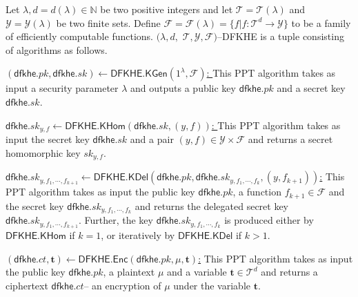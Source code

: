 \documentclass[runningheads,10pt]{llncs}
\begin{document}
\begin{definition}[DFKHE] \label{dfkhe2} Let $\lambda, d=d(\lambda) \in \mathbb{N}$ 
be two positive integers and  let  $\mathcal{T}=\mathcal{T}(\lambda)$ and $\mathcal{Y}=\mathcal{Y} (\lambda)$ be two finite sets. 
Define $\mathcal{F}=\mathcal{F}(\lambda)=\{f| f: \mathcal{T}^{d}  \rightarrow \mathcal{Y} \}$ to be a family of efficiently computable functions. 
$(\lambda, d,$ $\mathcal{T}, \mathcal{Y}, \mathcal{F})$--DFKHE  is a tuple  %
consisting of algorithms as follows.
\begin{description}
\item \underline{$( \mathsf{dfkhe}.pk, \mathsf{dfkhe}.sk) \leftarrow \mathsf{DFKHE.KGen}(1^\lambda,\mathcal{F} )$: } 
This PPT algorithm takes as input a security parameter $\lambda$ and outputs
 a public key $\mathsf{dfkhe}.pk$ and a secret key $\mathsf{dfkhe}.sk$. 
\item\underline{ $\mathsf{dfkhe}.sk_{y,f} \leftarrow \mathsf{DFKHE.KHom}(\mathsf{dfkhe}.sk, (y,f) )$: }  
This PPT algorithm takes as input the secret key $\mathsf{dfkhe}.sk$ and a pair $(y,f)\in \mathcal{Y} \times \mathcal{F} $
and returns a secret homomorphic  key $sk_{y,f}$.

\item \underline{ $\mathsf{dfkhe}.sk_{y, f_1,\cdots, f_{k+1}} \leftarrow \mathsf{DFKHE.KDel}(\mathsf{dfkhe}.pk, \mathsf{dfkhe}.sk_{y, f_1,\cdots, f_{k}}, (y,f_{k+1}) )$:}   
This PPT algorithm takes as input the public key $\mathsf{dfkhe}.pk$, a function $f_{k+1}\in \mathcal{F}$
and the secret key $\mathsf{dfkhe}.sk_{y, f_1,\cdots, f_{k}}$
and returns the delegated secret key $\mathsf{dfkhe}.sk_{y, f_1,\cdots, f_{k+1}}$. 
Further, the key $\mathsf{dfkhe}.sk_{y, f_1,\cdots, f_{k}}$ is produced either by $\mathsf{DFKHE.KHom}$ if $k=1$,
 or iteratively  by  $ \mathsf{DFKHE.KDel}$ if $k>1$.

\item \underline{$(\mathsf{dfkhe}.ct,\mathbf{t} ) \leftarrow \mathsf{DFKHE.Enc}(\mathsf{dfkhe}.pk,  \mu, \mathbf{t} )$:}    
This PPT algorithm takes as input the public key $\mathsf{dfkhe}.pk$, a plaintext $\mu$
 and a variable $\mathbf{t} \in \mathcal{T}^d$ 
 and returns a ciphertext $\mathsf{dfkhe}.ct$-- an encryption of $\mu$ under  the variable  $\mathbf{t} $.



\end{description}
\end{definition}
\end{document}
